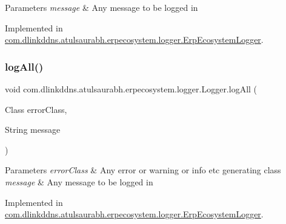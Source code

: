 \begin{DoxyParams}{Parameters}
{\em message} & Any message to be logged in \\
\hline
\end{DoxyParams}


Implemented in \mbox{\hyperlink{classcom_1_1dlinkddns_1_1atulsaurabh_1_1erpecosystem_1_1logger_1_1_erp_ecosystem_logger_a360f98d9c9cf93c49fbb0a6a1e3e922f}{com.\+dlinkddns.\+atulsaurabh.\+erpecosystem.\+logger.\+Erp\+Ecosystem\+Logger}}.

\mbox{\label{interfacecom_1_1dlinkddns_1_1atulsaurabh_1_1erpecosystem_1_1logger_1_1_logger_a232415e10e9da278b0bacf82309aef76}} 
\subsubsection{\texorpdfstring{log\+All()}{logAll()}\hspace{0.1cm}{\footnotesize\ttfamily [2/3]}}
{\footnotesize\ttfamily void com.\+dlinkddns.\+atulsaurabh.\+erpecosystem.\+logger.\+Logger.\+log\+All (\begin{DoxyParamCaption}\item[{Class}]{error\+Class,  }\item[{String}]{message }\end{DoxyParamCaption})}


\begin{DoxyParams}{Parameters}
{\em error\+Class} & Any error or warning or info etc generating class \\
\hline
{\em message} & Any message to be logged in \\
\hline
\end{DoxyParams}


Implemented in \mbox{\hyperlink{classcom_1_1dlinkddns_1_1atulsaurabh_1_1erpecosystem_1_1logger_1_1_erp_ecosystem_logger_a5bea48485386781a9eee8a78c2e2c9be}{com.\+dlinkddns.\+atulsaurabh.\+erpecosystem.\+logger.\+Erp\+Ecosystem\+Logger}}.

\mbox{\label{interfacecom_1_1dlinkddns_1_1atulsaurabh_1_1erpecosystem_1_1logger_1_1_logger_aba1204d7d2383973ddf63e537e11086d}} 
